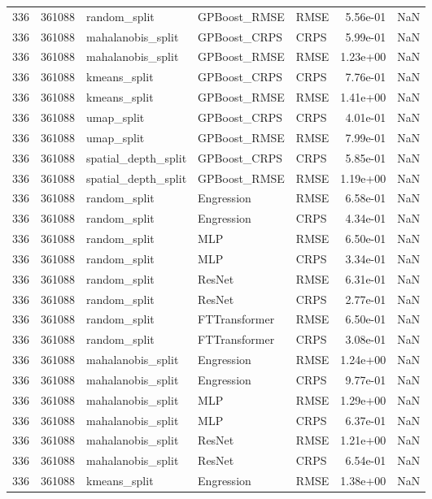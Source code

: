 \begin{tabular}{rrlllrr}
336 & 361088 & random\_split & GPBoost\_RMSE & RMSE & 5.56e-01 & NaN \\
336 & 361088 & mahalanobis\_split & GPBoost\_CRPS & CRPS & 5.99e-01 & NaN \\
336 & 361088 & mahalanobis\_split & GPBoost\_RMSE & RMSE & 1.23e+00 & NaN \\
336 & 361088 & kmeans\_split & GPBoost\_CRPS & CRPS & 7.76e-01 & NaN \\
336 & 361088 & kmeans\_split & GPBoost\_RMSE & RMSE & 1.41e+00 & NaN \\
336 & 361088 & umap\_split & GPBoost\_CRPS & CRPS & 4.01e-01 & NaN \\
336 & 361088 & umap\_split & GPBoost\_RMSE & RMSE & 7.99e-01 & NaN \\
336 & 361088 & spatial\_depth\_split & GPBoost\_CRPS & CRPS & 5.85e-01 & NaN \\
336 & 361088 & spatial\_depth\_split & GPBoost\_RMSE & RMSE & 1.19e+00 & NaN \\
336 & 361088 & random\_split & Engression & RMSE & 6.58e-01 & NaN \\
336 & 361088 & random\_split & Engression & CRPS & 4.34e-01 & NaN \\
336 & 361088 & random\_split & MLP & RMSE & 6.50e-01 & NaN \\
336 & 361088 & random\_split & MLP & CRPS & 3.34e-01 & NaN \\
336 & 361088 & random\_split & ResNet & RMSE & 6.31e-01 & NaN \\
336 & 361088 & random\_split & ResNet & CRPS & 2.77e-01 & NaN \\
336 & 361088 & random\_split & FTTransformer & RMSE & 6.50e-01 & NaN \\
336 & 361088 & random\_split & FTTransformer & CRPS & 3.08e-01 & NaN \\
336 & 361088 & mahalanobis\_split & Engression & RMSE & 1.24e+00 & NaN \\
336 & 361088 & mahalanobis\_split & Engression & CRPS & 9.77e-01 & NaN \\
336 & 361088 & mahalanobis\_split & MLP & RMSE & 1.29e+00 & NaN \\
336 & 361088 & mahalanobis\_split & MLP & CRPS & 6.37e-01 & NaN \\
336 & 361088 & mahalanobis\_split & ResNet & RMSE & 1.21e+00 & NaN \\
336 & 361088 & mahalanobis\_split & ResNet & CRPS & 6.54e-01 & NaN \\
336 & 361088 & kmeans\_split & Engression & RMSE & 1.38e+00 & NaN \\

\end{tabular}

